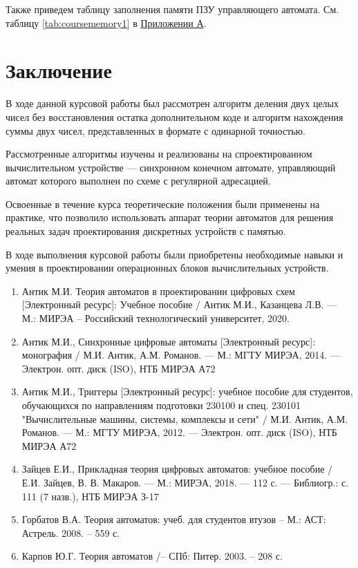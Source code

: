 \documentclass[a4paper,14pt]{extarticle}
\begin{document}
Также приведем таблицу заполнения памяти ПЗУ управляющего автомата. См. таблицу \ref{tab:coursememory1} в \hyperref[tam]{Приложении А}.
\fi

\section{Заключение}
В ходе данной курсовой работы был рассмотрен алгоритм деления двух целых чисел без восстановления остатка дополнительном коде и алгоритм нахождения суммы двух чисел, представленных в формате с одинарной точностью. 

Рассмотренные алгоритмы изучены и реализованы на спроектированном вычислительном устройстве --- синхронном конечном автомате, управляющий автомат которого выполнен по схеме с регулярной адресацией.

Освоенные в течение курса теоретические положения были применены на практике, что позволило использовать аппарат теории автоматов для решения реальных задач проектирования дискретных устройств с памятью. 

В ходе выполнения курсовой работы были приобретены необходимые навыки и умения в проектировании операционных блоков вычислительных устройств.


\label{biblio}
\begin{enumerate}
	\item Антик М.И. Теория автоматов в проектировании цифровых схем
	[Электронный ресурс]: Учебное пособие / Антик М.И., Казанцева
	Л.В. — М.: МИРЭА – Российский технологический университет,
	2020.
	\item Антик М.И., Синхронные цифровые автоматы [Электронный ресурс]:
	монография / М.И. Антик, А.М. Романов. — М.: МГТУ МИРЭА,
	2014. — Электрон. опт. диск (ISO), НТБ МИРЭА А72
	\item Антик М.И., Триггеры [Электронный ресурс]: учебное пособие для
	студентов, обучающихся по направлениям подготовки 230100 и спец.
	230101 "Вычислительные машины, системы, комплексы и сети" /
	М.И. Антик, А.М. Романов. — М.: МГТУ МИРЭА, 2012. — Электрон.
	опт. диск (ISO), НТБ МИРЭА А72
	\item Зайцев Е.И., Прикладная теория цифровых автоматов: учебное пособие / Е.И. Зайцев, В. В. Макаров. — М.: МИРЭА, 2018. — 112 с. —
	Библиогр.: с. 111 (7 назв.), НТБ МИРЭА З-17
	\item Горбатов В.А. Теория автоматов: учеб. для студентов втузов – М.:
	АСТ: Астрель. 2008. – 559 с.
	\item  Карпов Ю.Г. Теория автоматов /– СПб: Питер. 2003. – 208 с.
\end{enumerate}
\end{document}
